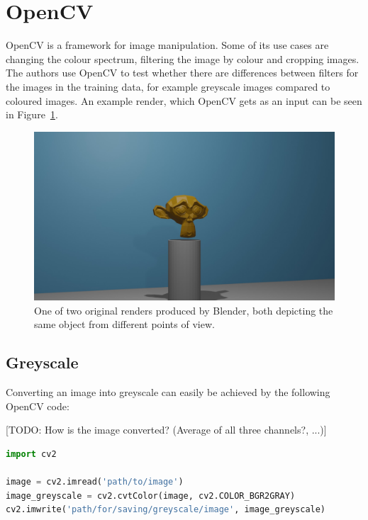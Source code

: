 \section{OpenCV}
OpenCV is a framework for image manipulation. Some of its use cases are changing the colour spectrum, filtering the image by colour and cropping images. The authors use OpenCV to test whether there are differences between filters for the images in the training data, for example greyscale images compared to coloured images. An example render, which OpenCV gets as an input can be seen in Figure~\ref{pic:implementation_opencv_original}.

\begin{figure}[h!]
	\centering
	\includegraphics[width=5in]{img/implementation_opencv_original.png}
	\caption{One of two original renders produced by Blender, both depicting the same object from different points of view.}	%
	\label{pic:implementation_opencv_original}
\end{figure}

\subsection{Greyscale}
Converting an image into greyscale can easily be achieved by the following OpenCV code:

[TODO: How is the image converted? (Average of all three channels?, ...)]

\begin{lstlisting}[language=python]
import cv2

image = cv2.imread('path/to/image')
image_greyscale = cv2.cvtColor(image, cv2.COLOR_BGR2GRAY)
cv2.imwrite('path/for/saving/greyscale/image', image_greyscale)
\end{lstlisting}

